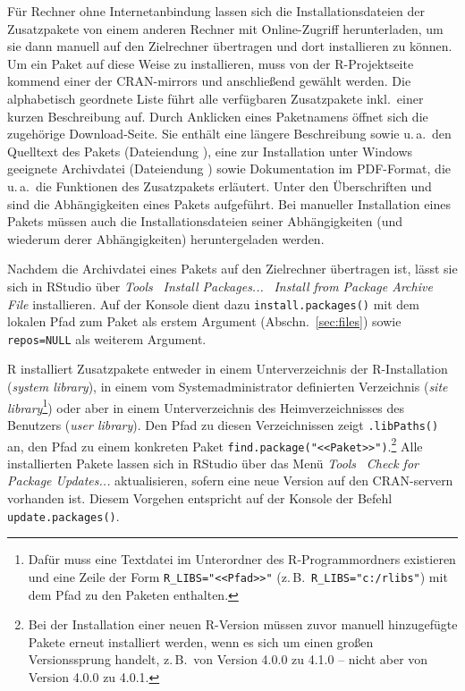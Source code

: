 Für Rechner ohne Internetanbindung lassen sich die Installationsdateien der Zusatzpakete von einem anderen Rechner mit Online-Zugriff herunterladen, um sie dann manuell auf den Zielrechner übertragen und dort installieren zu können. Um ein Paket auf diese Weise zu installieren, muss von der R-Projektseite kommend einer der CRAN-mirrors und anschließend  gewählt werden. Die alphabetisch geordnete Liste führt alle verfügbaren Zusatzpakete inkl.\ einer kurzen Beschreibung auf. Durch Anklicken eines Paketnamens öffnet sich die zugehörige Download-Seite. Sie enthält eine längere Beschreibung sowie u.\,a.\ den Quelltext des Pakets (Dateiendung ), eine zur Installation unter Windows geeignete Archivdatei (Dateiendung ) sowie Dokumentation im PDF-Format, die u.\,a.\ die Funktionen des Zusatzpakets erläutert. Unter den Überschriften  und  sind die Abhängigkeiten eines Pakets aufgeführt. Bei manueller Installation eines Pakets müssen auch die Installationsdateien seiner Abhängigkeiten (und wiederum derer Abhängigkeiten) heruntergeladen werden.

Nachdem die Archivdatei eines Pakets auf den Zielrechner übertragen ist, lässt sie sich in RStudio über \emph{Tools} \textrightarrow\ \emph{Install Packages...} \textrightarrow\ \emph{Install from Package Archive File} installieren. Auf der Konsole dient dazu \lstinline!install.packages()! mit dem lokalen Pfad zum Paket als erstem Argument (Abschn.\ \ref{sec:files}) sowie \lstinline!repos=NULL! als weiterem Argument.

R installiert Zusatzpakete entweder in einem Unterverzeichnis der R-Installation (\emph{system library}), in einem vom Systemadministrator definierten Verzeichnis (\emph{site library}\footnote{Dafür muss eine Textdatei  im Unterordner  des R-Programmordners existieren und eine Zeile der Form \lstinline!R_LIBS="<<Pfad>>"! (z.\,B.\ \lstinline!R_LIBS="c:/rlibs"!) mit dem Pfad zu den Paketen enthalten.}) oder aber in einem Unterverzeichnis des Heimverzeichnisses des Benutzers (\emph{user library}). Den Pfad zu diesen Verzeichnissen zeigt \lstinline!.libPaths()! an, den Pfad zu einem konkreten Paket \lstinline!find.package("<<Paket>>")!.\footnote{Bei der Installation einer neuen R-Version müssen zuvor manuell hinzugefügte Pakete erneut installiert werden, wenn es sich um einen großen Versionssprung handelt, z.\,B.\ von Version 4.0.0 zu 4.1.0 -- nicht aber von Version 4.0.0 zu 4.0.1.} Alle installierten Pakete lassen sich in RStudio über das Menü \emph{Tools} \textrightarrow\ \emph{Check for Package Updates...} aktualisieren, sofern eine neue Version auf den CRAN-servern vorhanden ist. Diesem Vorgehen entspricht auf der Konsole der Befehl \lstinline!update.packages()!.

